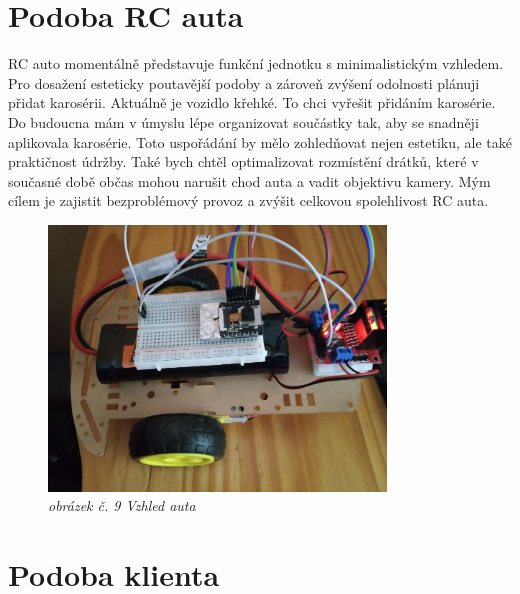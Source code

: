 \documentclass[12pt, a4paper,
oneside,      %
openany
]{report}
\begin{document}
    \section{Podoba RC auta}
    \noindent RC auto momentálně představuje funkční jednotku s minimalistickým vzhledem. Pro dosažení esteticky poutavější podoby a zároveň zvýšení odolnosti plánuji přidat karosérii. Aktuálně je vozidlo křehké. To chci vyřešit přidáním karosérie. Do budoucna mám v úmyslu lépe organizovat součástky tak, aby se snadněji aplikovala karosérie. Toto uspořádání by mělo zohledňovat nejen estetiku, ale také praktičnost údržby. Také bych chtěl optimalizovat rozmístění drátků, které v současné době občas mohou narušit chod auta a vadit objektivu kamery. Mým cílem je zajistit bezproblémový provoz a zvýšit celkovou spolehlivost RC auta.
       \begin{figure}[H]
    \centering
	\includegraphics[width=0.8\textwidth]{image/car.png}
    \caption*{\textit{obrázek č. 9 Vzhled auta}}
    \label{fig:webDesign}
\end{figure}
    
    \section{Podoba klienta}
\end{document}
